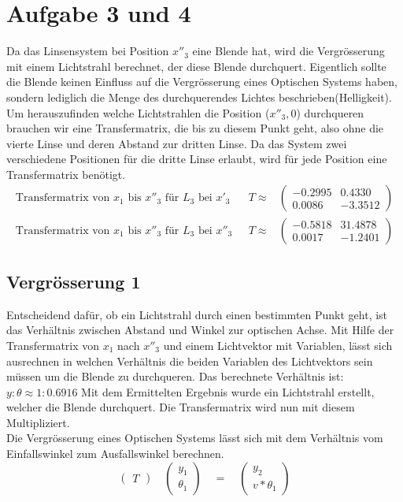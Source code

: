 \documentclass[11pt,twoside,a4paper]{article}
\begin{document}
	\section{Aufgabe 3 und 4}
	Da das Linsensystem bei Position \(x''_{3}\) eine Blende hat, wird die Vergrösserung mit einem Lichtstrahl berechnet, der diese Blende durchquert. Eigentlich sollte die Blende keinen Einfluss auf die Vergrösserung eines Optischen Systems haben, sondern lediglich die Menge des durchquerendes Lichtes beschrieben(Helligkeit). \\
	Um herauszufinden welche Lichtstrahlen die Position (\(x''_{3},0\)) durchqueren brauchen wir eine Transfermatrix, die bis zu diesem Punkt geht, also ohne die vierte Linse und deren Abstand zur dritten Linse.
	Da das System zwei verschiedene Positionen für die dritte Linse erlaubt, wird für jede Position eine Transfermatrix benötigt. 
	\begin{equation*}
	\begin{aligned}
	\textrm{Transfermatrix von \(x_{1}\) bis \(x''_{3}\) für \(L_{3}\) bei \(x'_{3}\) } & T \approx
	&
	\begin{pmatrix}
	-0.2995 & 0.4330\\
	0.0086 & -3.3512
	\end{pmatrix}\\
	\textrm{Transfermatrix von \(x_{1}\) bis \(x''_{3}\) für \(L_{3}\) bei \(x''_{3}\) } & T \approx
	&
	\begin{pmatrix}
	-0.5818 & 31.4878\\
	0.0017 & -1.2401
	\end{pmatrix}
	\end{aligned}
	\end{equation*}
	\subsection{Vergrösserung 1}
	Entscheidend dafür, ob ein Lichtstrahl durch einen bestimmten Punkt geht, ist das Verhältnis zwischen Abstand und Winkel zur optischen Achse. Mit Hilfe der Transfermatrix von \(x_{1}\) nach \(x''_{3}\) und einem Lichtvektor mit Variablen, lässt sich ausrechnen in welchen Verhältnis die beiden Variablen des Lichtvektors sein müssen um die Blende zu durchqueren. Das berechnete Verhältnis ist: \(y:\theta \approx 1:0.6916\) Mit dem Ermittelten Ergebnis wurde ein Lichtstrahl erstellt, welcher die Blende durchquert. Die Transfermatrix wird nun mit diesem Multipliziert. \\
	Die Vergrösserung eines Optischen Systems lässt sich mit dem Verhältnis vom Einfallswinkel zum Ausfallswinkel berechnen. 
	\begin{equation} \label{vergr}
	\begin{pmatrix}
	T
	\end{pmatrix}
	\quad
	\begin{pmatrix}
	y_{1}\\
	\theta_{1}
	\end{pmatrix}
	\quad
	=
	\quad
	\begin{pmatrix}
	y_{2}\\
	v * \theta_{1}
	\end{pmatrix}
	\end{equation}
	
\end{document}
